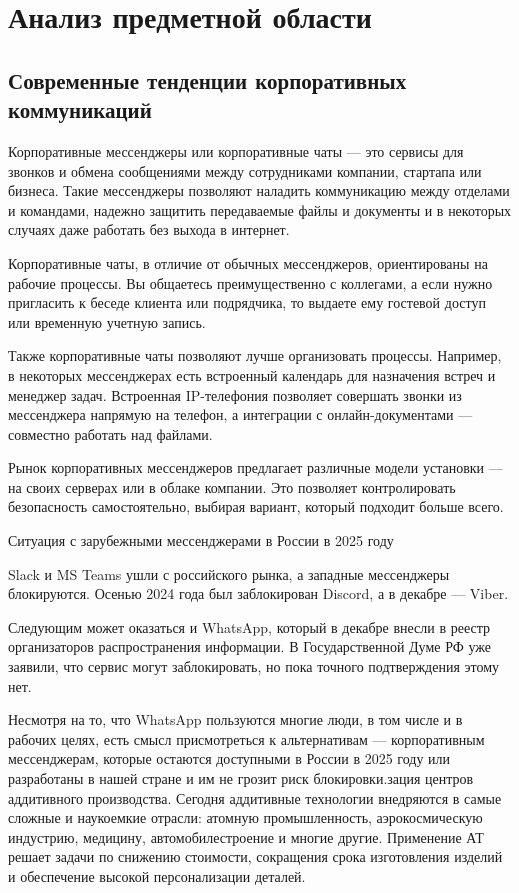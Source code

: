 \section{Анализ предметной области}
\subsection{Современные тенденции корпоративных коммуникаций}

Корпоративные мессенджеры или корпоративные чаты — это сервисы для звонков и обмена сообщениями между сотрудниками компании, стартапа или бизнеса. Такие мессенджеры позволяют наладить коммуникацию между отделами и командами, надежно защитить передаваемые файлы и документы и в некоторых случаях даже работать без выхода в интернет.  

Корпоративные чаты, в отличие от обычных мессенджеров, ориентированы на рабочие процессы. Вы общаетесь преимущественно с коллегами, а если нужно пригласить к беседе клиента или подрядчика, то выдаете ему гостевой доступ или временную учетную запись. 

Также корпоративные чаты позволяют лучше организовать процессы. Например, в некоторых мессенджерах есть встроенный календарь для назначения встреч и менеджер задач. Встроенная IP-телефония позволяет совершать звонки из мессенджера напрямую на телефон, а интеграции с онлайн-документами — совместно работать над файлами.

Рынок корпоративных мессенджеров предлагает различные модели установки — на своих серверах или в облаке компании. Это позволяет контролировать безопасность самостоятельно, выбирая вариант, который подходит больше всего.

Ситуация с зарубежными мессенджерами в России в 2025 году

Slack и MS Teams ушли с российского рынка, а западные мессенджеры блокируются. Осенью 2024 года был заблокирован Discord, а в декабре — Viber.

Следующим может оказаться и WhatsApp, который в декабре внесли в реестр организаторов распространения информации. В Государственной Думе РФ уже заявили, что сервис могут заблокировать, но пока точного подтверждения этому нет.

Несмотря на то, что WhatsApp пользуются многие люди, в том числе и в рабочих целях, есть смысл присмотреться к альтернативам — корпоративным мессенджерам, которые остаются доступными в России в 2025 году или разработаны в нашей стране и им не грозит риск блокировки.зация центров аддитивного производства. Сегодня аддитивные технологии внедряются в самые сложные и наукоемкие отрасли: атомную промышленность, аэрокосмическую индустрию, медицину, автомобилестроение и многие другие. Применение АТ решает задачи по снижению стоимости, сокращения срока изготовления изделий и обеспечение высокой персонализации деталей.
